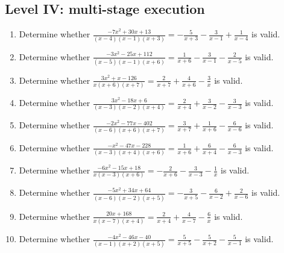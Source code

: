 \documentclass[11pt,oneside]{book}
\begin{document}
\subsection*{Level IV: multi-stage execution}
\begin{enumerate}[leftmargin=*,label=\textbf{\arabic*.},itemsep=0.65\baselineskip]
\item Determine whether $\displaystyle \frac{- 7 x^{2} + 30 x + 13}{\left(x - 4\right) \left(x - 1\right) \left(x + 3\right)}=- \frac{5}{x + 3} - \frac{3}{x - 1} + \frac{1}{x - 4}$ is valid.
\item Determine whether $\displaystyle \frac{- 3 x^{2} - 25 x + 112}{\left(x - 5\right) \left(x - 1\right) \left(x + 6\right)}=\frac{1}{x + 6} - \frac{3}{x - 1} - \frac{2}{x - 5}$ is valid.
\item Determine whether $\displaystyle \frac{3 x^{2} + x - 126}{x \left(x + 6\right) \left(x + 7\right)}=\frac{2}{x + 7} + \frac{4}{x + 6} - \frac{3}{x}$ is valid.
\item Determine whether $\displaystyle \frac{3 x^{2} - 18 x + 6}{\left(x - 3\right) \left(x - 2\right) \left(x + 4\right)}=\frac{2}{x + 4} + \frac{3}{x - 2} - \frac{3}{x - 3}$ is valid.
\item Determine whether $\displaystyle \frac{- 2 x^{2} - 77 x - 402}{\left(x - 6\right) \left(x + 6\right) \left(x + 7\right)}=\frac{3}{x + 7} + \frac{1}{x + 6} - \frac{6}{x - 6}$ is valid.
\item Determine whether $\displaystyle \frac{- x^{2} - 47 x - 228}{\left(x - 3\right) \left(x + 4\right) \left(x + 6\right)}=\frac{1}{x + 6} + \frac{6}{x + 4} - \frac{6}{x - 3}$ is valid.
\item Determine whether $\displaystyle \frac{- 6 x^{2} - 15 x + 18}{x \left(x - 3\right) \left(x + 6\right)}=- \frac{2}{x + 6} - \frac{3}{x - 3} - \frac{1}{x}$ is valid.
\item Determine whether $\displaystyle \frac{- 5 x^{2} + 34 x + 64}{\left(x - 6\right) \left(x - 2\right) \left(x + 5\right)}=- \frac{3}{x + 5} - \frac{6}{x - 2} + \frac{2}{x - 6}$ is valid.
\item Determine whether $\displaystyle \frac{20 x + 168}{x \left(x - 7\right) \left(x + 4\right)}=\frac{2}{x + 4} + \frac{4}{x - 7} - \frac{6}{x}$ is valid.
\item Determine whether $\displaystyle \frac{- 4 x^{2} - 46 x - 40}{\left(x - 1\right) \left(x + 2\right) \left(x + 5\right)}=\frac{5}{x + 5} - \frac{5}{x + 2} - \frac{5}{x - 1}$ is valid.
\end{enumerate}
\end{document}
